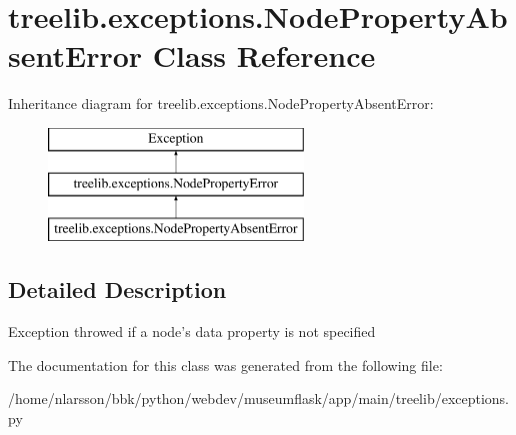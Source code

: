 \hypertarget{classtreelib_1_1exceptions_1_1NodePropertyAbsentError}{}\section{treelib.\+exceptions.\+Node\+Property\+Absent\+Error Class Reference}
\label{classtreelib_1_1exceptions_1_1NodePropertyAbsentError}
Inheritance diagram for treelib.\+exceptions.\+Node\+Property\+Absent\+Error\+:\begin{figure}[H]
\begin{center}
\leavevmode
\includegraphics[height=3.000000cm]{classtreelib_1_1exceptions_1_1NodePropertyAbsentError}
\end{center}
\end{figure}


\subsection{Detailed Description}
\begin{DoxyVerb}Exception throwed if a node's data property is not specified\end{DoxyVerb}
 

The documentation for this class was generated from the following file\+:\begin{DoxyCompactItemize}
\item 
/home/nlarsson/bbk/python/webdev/museumflask/app/main/treelib/exceptions.\+py\end{DoxyCompactItemize}
